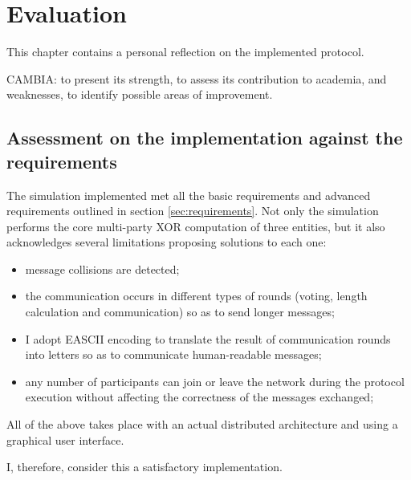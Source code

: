 \chapter{Evaluation}
This chapter contains a personal reflection on the implemented protocol. 

CAMBIA: to present its strength, to assess its contribution to academia,  and weaknesses, to identify possible areas of improvement. 

\section{Assessment on the implementation against the requirements}
The simulation implemented met all the basic requirements and advanced requirements outlined in section \ref{sec:requirements}. Not only the simulation performs the core multi-party XOR computation of three entities, but it also acknowledges several limitations proposing solutions to each one:
\begin{itemize}
    \item message collisions are detected;
    \item the communication occurs in different types of rounds (voting, length calculation and communication) so as to send longer messages;
    \item I adopt EASCII encoding to translate the result of communication rounds into letters so as to communicate human-readable messages;
    \item any number of participants can join or leave the network during the protocol execution without affecting the correctness of the messages exchanged;
\end{itemize}
All of the above takes place with an actual distributed architecture and using a graphical user interface.

I, therefore, consider this a satisfactory implementation.



